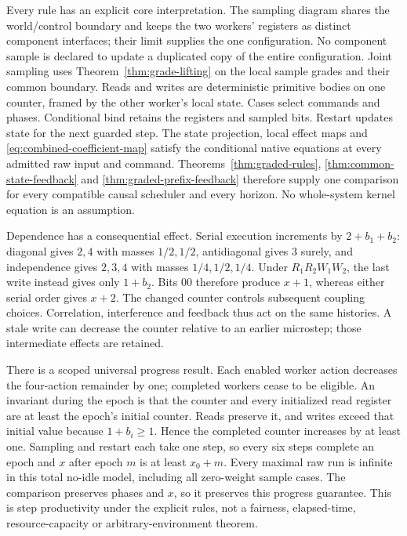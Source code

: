 \documentclass[11pt]{article}
\begin{document}
Every rule has an explicit core interpretation. The sampling diagram shares the world/control boundary and keeps the two workers' registers as distinct component interfaces; their limit supplies the one configuration. No component sample is declared to update a duplicated copy of the entire configuration. Joint sampling uses Theorem~\ref{thm:grade-lifting} on the local sample grades and their common boundary. Reads and writes are deterministic primitive bodies on one counter, framed by the other worker's local state. Cases select commands and phases. Conditional bind retains the registers and sampled bits. Restart updates state for the next guarded step. The state projection, local effect maps and \eqref{eq:combined-coefficient-map} satisfy the conditional native equations at every admitted raw input and command. Theorems~\ref{thm:graded-rules}, \ref{thm:common-state-feedback} and \ref{thm:graded-prefix-feedback} therefore supply one comparison for every compatible causal scheduler and every horizon. No whole-system kernel equation is an assumption.

Dependence has a consequential effect. Serial execution increments by $2+b_1+b_2$: diagonal gives $2,4$ with masses $1/2,1/2$, antidiagonal gives $3$ surely, and independence gives $2,3,4$ with masses $1/4,1/2,1/4$. Under $R_1R_2W_1W_2$, the last write instead gives only $1+b_2$. Bits $00$ therefore produce $x+1$, whereas either serial order gives $x+2$. The changed counter controls subsequent coupling choices. Correlation, interference and feedback thus act on the same histories. A stale write can decrease the counter relative to an earlier microstep; those intermediate effects are retained.

There is a scoped universal progress result. Each enabled worker action decreases the four-action remainder by one; completed workers cease to be eligible. An invariant during the epoch is that the counter and every initialized read register are at least the epoch's initial counter. Reads preserve it, and writes exceed that initial value because $1+b_i\ge1$. Hence the completed counter increases by at least one. Sampling and restart each take one step, so every six steps complete an epoch and $x$ after epoch $m$ is at least $x_0+m$. Every maximal raw run is infinite in this total no-idle model, including all zero-weight sample cases. The comparison preserves phases and $x$, so it preserves this progress guarantee. This is step productivity under the explicit rules, not a fairness, elapsed-time, resource-capacity or arbitrary-environment theorem.
\end{document}
